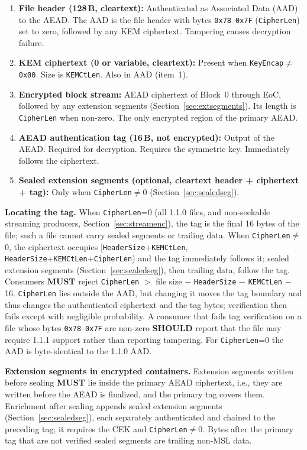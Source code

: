 \documentclass[11pt,a4paper]{article}
\newcommand{\MUST}{\textbf{MUST}}
\newcommand{\SHOULD}{\textbf{SHOULD}}
\newcommand{\hex}[1]{\texttt{0x#1}}
\newcommand{\field}[1]{\texttt{#1}}
\begin{document}
\begin{enumerate}[leftmargin=1.8em, itemsep=2pt]
\item \textbf{File header (128\,B, cleartext):} Authenticated as Associated Data (AAD) to the AEAD. The AAD is the file header with bytes \hex{78}--\hex{7F} (\field{CipherLen}) set to zero, followed by any KEM ciphertext. Tampering causes decryption failure.
\item \textbf{KEM ciphertext (0 or variable, cleartext):} Present when \field{KeyEncap}$\neq$\hex{00}. Size is \field{KEMCtLen}. Also in AAD (item~1).
\item \textbf{Encrypted block stream:} AEAD ciphertext of Block~0 through EoC, followed by any extension segments (Section~\ref{sec:extsegments}). Its length is \field{CipherLen} when non-zero. The only encrypted region of the primary AEAD.
\item \textbf{AEAD authentication tag (16\,B, not encrypted):} Output of the AEAD. Required for decryption. Requires the symmetric key. Immediately follows the ciphertext.
\item \textbf{Sealed extension segments (optional, cleartext header + ciphertext + tag):} Only when \field{CipherLen}$\neq$0 (Section~\ref{sec:sealedseg}).
\end{enumerate}

\noindent\textbf{Locating the tag.} When \field{CipherLen}=0 (all 1.1.0 files, and non-seekable streaming producers, Section~\ref{sec:streamenc}), the tag is the final 16 bytes of the file; such a file cannot carry sealed segments or trailing data. When \field{CipherLen}$\neq$0, the ciphertext occupies [\field{HeaderSize}+\field{KEMCtLen}, \field{HeaderSize}+\field{KEMCtLen}+\field{CipherLen}) and the tag immediately follows it; sealed extension segments (Section~\ref{sec:sealedseg}), then trailing data, follow the tag. Consumers \MUST{} reject \field{CipherLen} $>$ file size $-$ \field{HeaderSize} $-$ \field{KEMCtLen} $-$ 16. \field{CipherLen} lies outside the AAD, but changing it moves the tag boundary and thus changes the authenticated ciphertext and the tag bytes; verification then fails except with negligible probability. A consumer that fails tag verification on a file whose bytes \hex{78}--\hex{7F} are non-zero \SHOULD{} report that the file may require 1.1.1 support rather than reporting tampering. For \field{CipherLen}=0 the AAD is byte-identical to the 1.1.0 AAD.

\noindent\textbf{Extension segments in encrypted containers.} Extension segments written before sealing \MUST{} lie inside the primary AEAD ciphertext, i.e., they are written before the AEAD is finalized, and the primary tag covers them. Enrichment after sealing appends sealed extension segments (Section~\ref{sec:sealedseg}), each separately authenticated and chained to the preceding tag; it requires the CEK and \field{CipherLen}$\neq$0. Bytes after the primary tag that are not verified sealed segments are trailing non-MSL data.
\end{document}
